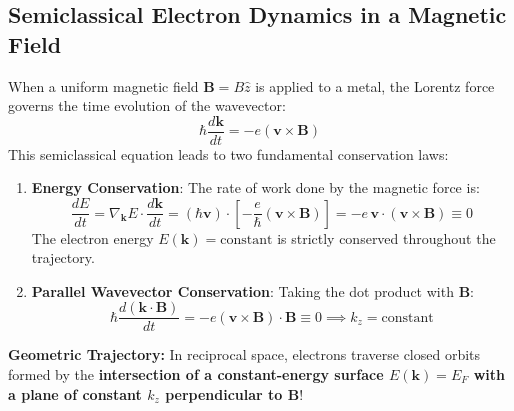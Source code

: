 \documentclass[11pt,a4paper]{article}
\newcommand{\vb}[1]{\mathbf{#1}}
\begin{document}
\subsection{Semiclassical Electron Dynamics in a Magnetic Field}
When a uniform magnetic field $\vb{B} = B\hat{z}$ is applied to a metal, the Lorentz force governs the time evolution of the wavevector:
\begin{equation}
\hbar \frac{d\vb{k}}{dt} = -e\left( \vb{v}\times\vb{B} \right)
\label{eq:lorentz_k_dot}
\end{equation}
This semiclassical equation leads to two fundamental conservation laws:
\begin{enumerate}
    \item \textbf{Energy Conservation}: The rate of work done by the magnetic force is:
    \begin{equation}
    \frac{dE}{dt} = \nabla_{\vb{k}}E \cdot \frac{d\vb{k}}{dt} = (\hbar\vb{v})\cdot\left[ -\frac{e}{\hbar}(\vb{v}\times\vb{B}) \right] = -e\,\vb{v}\cdot(\vb{v}\times\vb{B}) \equiv 0
    \end{equation}
    The electron energy $E(\vb{k}) = \mathrm{constant}$ is strictly conserved throughout the trajectory.
    \item \textbf{Parallel Wavevector Conservation}: Taking the dot product with $\vb{B}$:
    \begin{equation}
    \hbar \frac{d(\vb{k}\cdot\vb{B})}{dt} = -e(\vb{v}\times\vb{B})\cdot\vb{B} \equiv 0 \implies k_z = \mathrm{constant}
    \end{equation}
\end{enumerate}
\textbf{Geometric Trajectory:} In reciprocal space, electrons traverse closed orbits formed by the \textbf{intersection of a constant-energy surface $E(\vb{k}) = E_F$ with a plane of constant $k_z$ perpendicular to $\vb{B}$}!
\end{document}
